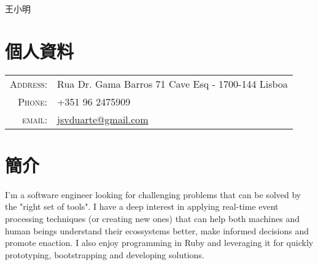 \documentclass[a4paper,10pt]{article}
\begin{document}
\pagestyle{empty} %

\par{\centering
	{\Huge 王小明
}\bigskip\par}

\section{個人資料}

\begin{tabular}{rl}
    \textsc{Address:}   & Rua Dr. Gama Barros 71 Cave Esq - 1700-144 Lisboa\\
    \textsc{Phone:}     & +351 96 2475909\\
    \textsc{email:}     & \href{mailto:jsvduarte@gmail.com}{jsvduarte@gmail.com} \\
\end{tabular}

\section{簡介}
I'm a software engineer looking for challenging problems that can be solved by
the "right set of tools". I have a deep interest in applying real-time event processing
techniques (or creating new ones) that can help both machines and human beings understand
their ecossystems better, make informed decisions and promote enaction. I also enjoy programming in Ruby
and leveraging it for quickly prototyping, bootstrapping and developing solutions.

\end{document}
